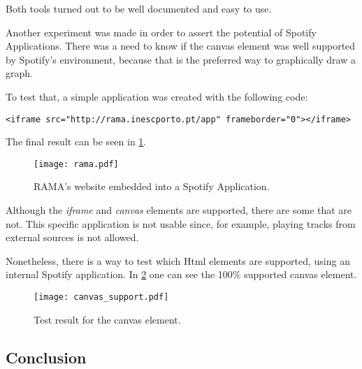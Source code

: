     Both tools turned out to be well documented and easy to use.


    Another experiment was made in order to assert the potential of Spotify Applications.
    There was a need to know if the canvas element was well supported by Spotify's environment, because that is the preferred way to graphically draw a graph.

    To test that, a simple application was created with the following code:

    \begin{lstlisting}[caption={\emph{iframe} element that allows to embed RAMA's website into the application.}, style=htmlcssjs]
      <iframe src="http://rama.inescporto.pt/app" frameborder="0"></iframe>\end{lstlisting}

    The final result can be seen in \ref{fig:rama_spotifyed}.

    \begin{figure}
      \begin{center}
        \texttt{[image: rama.pdf]}
      \end{center}
      \caption{RAMA's website embedded into a Spotify Application.}
      \label{fig:rama_spotifyed}
    \end{figure}

    Although the \emph{iframe} and \emph{canvas} elements are supported, there are some that are not.
    This specific application is not usable since, for example, playing tracks from external sources is not allowed.

    Nonetheless, there is a way to test which Html elements are supported, using an internal Spotify application.
    In \ref{fig:canvas_support} one can see the 100\% supported canvas element.

    \begin{figure}
       \begin{center}
         \texttt{[image: canvas\_support.pdf]}
       \end{center}
       \caption{Test result for the canvas element.}
       \label{fig:canvas_support}
     \end{figure}


  \subsection{Conclusion} %
  \label{sub:conclusion}


